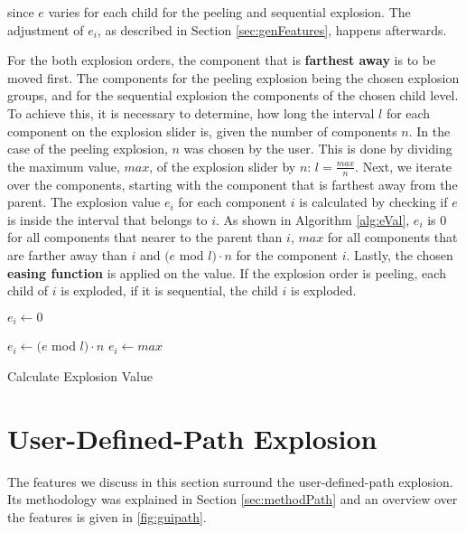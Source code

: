 \documentclass[draft,final]{vutinfth} %
\begin{document}
since $e$ varies for each child for the peeling and sequential explosion. The adjustment of $e_i$, as described in Section \ref{sec:genFeatures}, happens afterwards.

\par For the both explosion orders, the component that is \textbf{farthest away} is to be moved first.
The components for the peeling explosion being the chosen explosion groups, and for the sequential explosion the components of the chosen child level.
To achieve this, it is necessary to determine, how long the interval $l$ for each component on the explosion slider is, given the number of components $n$.
In the case of the peeling explosion, $n$ was chosen by the user.
This is done by dividing the maximum value, $max$, of the explosion slider by $n$: $l = \frac{max}{n}$.
Next, we iterate over the components, starting with the component that is farthest away from the parent.
The explosion value $e_i$ for each component $i$ is calculated by checking if $e$ is inside the interval that belongs to $i$.
As shown in Algorithm \ref{alg:eVal}, $e_i$ is 0 for all components that nearer to the parent than $i$, $max$ for all components that are farther away than $i$ and $(e$ mod $l) \cdot n$ for the component $i$.
Lastly, the chosen \textbf{easing function} is applied on the value.
If the explosion order is peeling, each child of $i$ is exploded, if it is sequential, the child $i$ is exploded.

\begin{algorithm}
  
  $e_i\leftarrow 0$\;
  
  {
  	$e_i\leftarrow (e$ mod $l) \cdot n$\;
  }
  {
  	$e_i\leftarrow max$\;
  }

  \caption{Calculate Explosion Value}
  \label{alg:eVal} %
\end{algorithm}

\section{User-Defined-Path Explosion}
\label{sec:implPath}

The features we discuss in this section surround the user-defined-path explosion. Its methodology was explained in Section \ref{sec:methodPath} and an overview over the features is given in \autoref{fig:guipath}.
\end{document}
